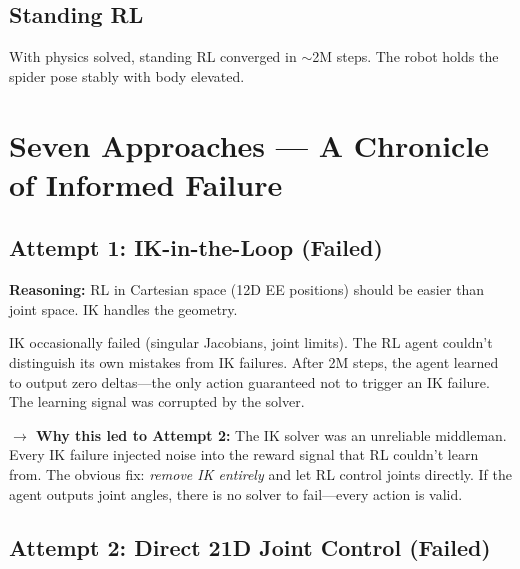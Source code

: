 \documentclass[11pt, a4paper]{article}
\begin{document}
\subsection{Standing RL}

With physics solved, standing RL converged in $\sim$2M steps. The robot holds the spider pose stably with body elevated.


\section{Seven Approaches --- A Chronicle of Informed Failure}
\label{sec:approaches}

\subsection{Attempt 1: IK-in-the-Loop (Failed)}

\textbf{Reasoning:} RL in Cartesian space (12D EE positions) should be easier than joint space. IK handles the geometry.

\begin{failbox}
IK occasionally failed (singular Jacobians, joint limits). The RL agent couldn't distinguish its own mistakes from IK failures. After 2M steps, the agent learned to output zero deltas---the only action guaranteed not to trigger an IK failure. The learning signal was corrupted by the solver.
\end{failbox}

\noindent\textcolor{accentpurple}{\textbf{$\rightarrow$ Why this led to Attempt 2:}} The IK solver was an unreliable middleman. Every IK failure injected noise into the reward signal that RL couldn't learn from. The obvious fix: \textit{remove IK entirely} and let RL control joints directly. If the agent outputs joint angles, there is no solver to fail---every action is valid.

\subsection{Attempt 2: Direct 21D Joint Control (Failed)}
\end{document}
